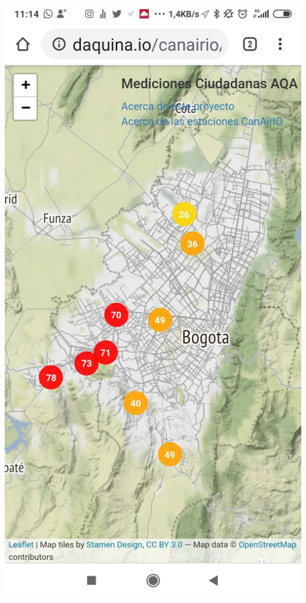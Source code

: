 \documentclass[a0paper,portrait]{baposter}
\begin{document}
\begin{poster}
{{{    	\includegraphics[scale=.078]{images/map_static_stations00.jpg}
    }
    {
        \hspace{-0.4cm}
        \centering
}}}
\end{poster}
\end{document}
